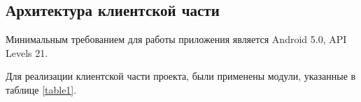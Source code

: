 \subsection{Архитектура клиентской части}

Минимальным требованием для работы приложения является Android 5.0, API Levels 21.

Для реализации клиентской части проекта, были применены модули, указанные в таблице \ref{table1}.
